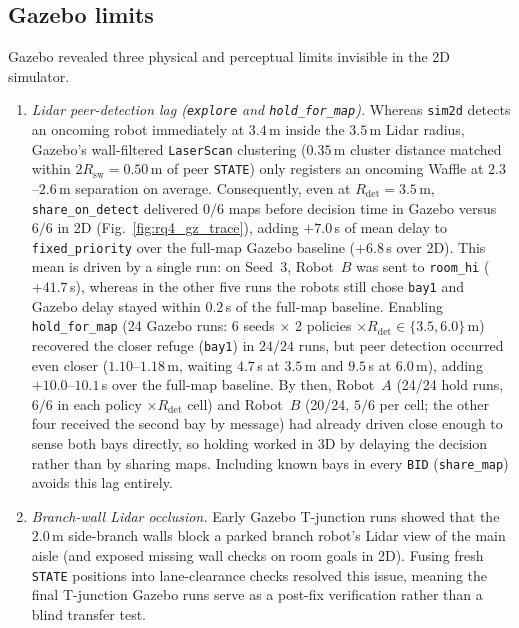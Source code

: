 \documentclass[journal,onecolumn]{IEEEtran}
\begin{document}
\subsection{Gazebo limits}
Gazebo revealed three physical and perceptual limits invisible in the 2D simulator.
\begin{enumerate}
\item \emph{Lidar peer-detection lag (\texttt{explore} and \texttt{hold\_for\_map}).} Whereas \texttt{sim2d} detects an oncoming robot immediately at $3.4$\,m inside the $3.5$\,m Lidar radius, Gazebo's wall-filtered \texttt{LaserScan} clustering ($0.35$\,m cluster distance matched within $2R_{\mathrm{sw}}=0.50$\,m of peer \texttt{STATE}) only registers an oncoming Waffle at $2.3$--$2.6$\,m separation on average. Consequently, even at $R_{\mathrm{det}}=3.5$\,m, \texttt{share\_on\_detect} delivered $0/6$ maps before decision time in Gazebo versus $6/6$ in 2D (Fig.~\ref{fig:rq4_gz_trace}), adding $+7.0$\,s of mean delay to \texttt{fixed\_priority} over the full-map Gazebo baseline ($+6.8$\,s over 2D). This mean is driven by a single run: on Seed~3, Robot~$B$ was sent to \texttt{room\_hi} ($+41.7$\,s), whereas in the other five runs the robots still chose \texttt{bay1} and Gazebo delay stayed within $0.2$\,s of the full-map baseline. Enabling \texttt{hold\_for\_map} (24 Gazebo runs: 6 seeds $\times$ 2 policies $\times R_{\mathrm{det}}\in\{3.5,6.0\}$\,m) recovered the closer refuge (\texttt{bay1}) in $24/24$ runs, but peer detection occurred even closer ($1.10$--$1.18$\,m, waiting $4.7$\,s at $3.5$\,m and $9.5$\,s at $6.0$\,m), adding $+10.0$--$10.1$\,s over the full-map baseline. By then, Robot~$A$ (24/24 hold runs, $6/6$ in each policy $\times R_{\mathrm{det}}$ cell) and Robot~$B$ (20/24, $5/6$ per cell; the other four received the second bay by message) had already driven close enough to sense both bays directly, so holding worked in 3D by delaying the decision rather than by sharing maps. Including known bays in every \texttt{BID} (\texttt{share\_map}) avoids this lag entirely.
\item \emph{Branch-wall Lidar occlusion.} Early Gazebo T-junction runs showed that the $2.0$\,m side-branch walls block a parked branch robot's Lidar view of the main aisle (and exposed missing wall checks on room goals in 2D). Fusing fresh \texttt{STATE} positions into lane-clearance checks resolved this issue, meaning the final T-junction Gazebo runs serve as a post-fix verification rather than a blind transfer test.

\end{enumerate}
\end{document}
